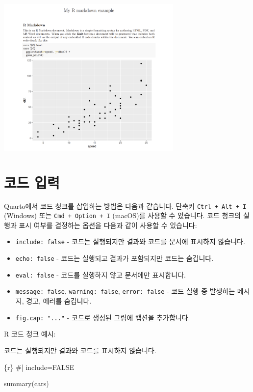 \documentclass[
  a4paper,
]{book}
\newenvironment{Shaded}{\begin{snugshade}}{\end{snugshade}}
\newcommand{\CommentTok}[1]{\textcolor[rgb]{0.37,0.37,0.37}{#1}}
\newcommand{\FunctionTok}[1]{\textcolor[rgb]{0.28,0.35,0.67}{#1}}
\newcommand{\InformationTok}[1]{\textcolor[rgb]{0.37,0.37,0.37}{#1}}
\newcommand{\NormalTok}[1]{\textcolor[rgb]{0.00,0.23,0.31}{#1}}
\providecommand{\tightlist}{%
  \setlength{\itemsep}{0pt}\setlength{\parskip}{0pt}}\usepackage{longtable,booktabs,array}
\begin{document}
\includegraphics[width=3.59375in,height=\textheight]{images/rmarkdown/ex_pdf.PNG}

\hypertarget{uxcf54uxb4dc-uxc785uxb825}{%
\section{코드 입력}\label{uxcf54uxb4dc-uxc785uxb825}}

Quarto에서 코드 청크를 삽입하는 방법은 다음과 같습니다. 단축키
\texttt{Ctrl\ +\ Alt\ +\ I} (Windows) 또는 \texttt{Cmd\ +\ Option\ +\ I}
(macOS)를 사용할 수 있습니다. 코드 청크의 실행과 표시 여부를 결정하는
옵션을 다음과 같이 사용할 수 있습니다:

\begin{itemize}
\tightlist
\item
  \texttt{include:\ false} - 코드는 실행되지만 결과와 코드를 문서에
  표시하지 않습니다.
\item
  \texttt{echo:\ false} - 코드는 실행되고 결과가 포함되지만 코드는
  숨깁니다.
\item
  \texttt{eval:\ false} - 코드를 실행하지 않고 문서에만 표시합니다.
\item
  \texttt{message:\ false}, \texttt{warning:\ false},
  \texttt{error:\ false} - 코드 실행 중 발생하는 메시지, 경고, 에러를
  숨깁니다.
\item
  \texttt{fig.cap:\ "..."} - 코드로 생성된 그림에 캡션을 추가합니다.
\end{itemize}

R 코드 청크 예시:

코드는 실행되지만 결과와 코드를 표시하지 않습니다.

\begin{Shaded}
\begin{Highlighting}[]
\InformationTok{\textasciigrave{}\textasciigrave{}\textasciigrave{}\{r\}}
\CommentTok{\#| include=FALSE}

\FunctionTok{summary}\NormalTok{(cars)}
\InformationTok{\textasciigrave{}\textasciigrave{}\textasciigrave{}}
\end{Highlighting}
\end{Shaded}
\end{document}
